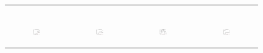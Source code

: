 \begin{figure}[ht]
\begin{tabular}{cccc}
\begin{subfigure}[b]{0.22\textwidth}
			\label{appfig:speedup_zigzag_setcover}
	  \end{subfigure} \\
	  \begin{subfigure}[b]{0.22\textwidth}
	  	\includegraphics[width=110pt]{images/diffFA_CF2G_bigsynthetic_maxgraphcut.eps}
			\caption{}
			\label{appfig:diffFA_CF2G_bigsynthetic_maxgraphcut}
	  \end{subfigure} &
	  \begin{subfigure}[b]{0.22\textwidth}
	  	\includegraphics[width=110pt]{images/diffFA_CF2G_bigsynthetic_setcover.eps}
			\caption{}
			\label{appfig:diffFA_CF2G_bigsynthetic_setcover}
	  \end{subfigure} &
	  \begin{subfigure}[b]{0.22\textwidth}
	  	\includegraphics[width=110pt]{images/diffFA_CF2G_zigzag_maxgraphcut.eps}
			\caption{}
			\label{appfig:diffFA_CF2G_zigzag_maxgraphcut}
	  \end{subfigure} &
	  \begin{subfigure}[b]{0.22\textwidth}
	  	\includegraphics[width=110pt]{images/diffFA_CF2G_zigzag_setcover.eps}
			\caption{}
			\label{appfig:diffFA_CF2G_zigzag_setcover}

\end{subfigure}
\end{tabular}
\end{figure}
